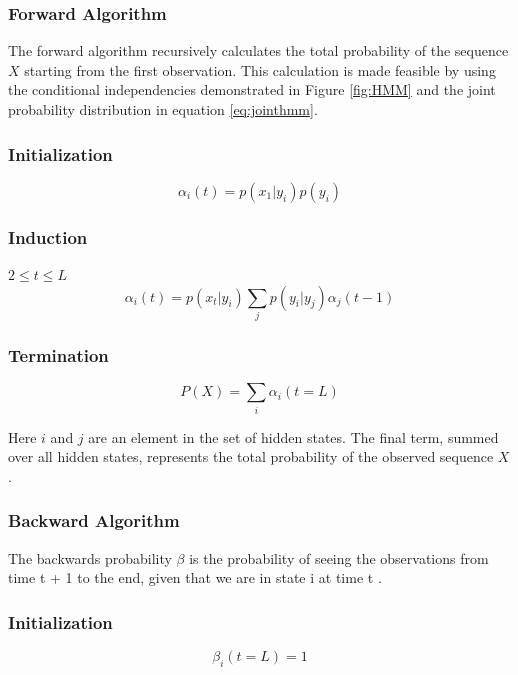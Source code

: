 \subsubsection{Forward Algorithm}
The forward algorithm recursively calculates the total probability of the sequence $X$ starting from the first observation. This calculation is made feasible by using the conditional independencies demonstrated in Figure \ref{fig:HMM} and the joint probability distribution in equation \ref{eq:jointhmm}.

\subsubsection{Initialization}
\begin{equation}
    \alpha_i(t) = p(x_1|y_i)p(y_i)
\label{eq:fwdinit}
\end{equation}

\subsubsection{Induction}
$2\leq t\leq L$
\begin{equation}
    \alpha_i(t) =p(x_t|y_i)\sum_{j}{p(y_i|y_j)\alpha_j(t-1)}
\label{eq:fwdinduc}
\end{equation}

\subsubsection{Termination}
\begin{equation}
    P(X)= \sum_i{\alpha_i(t=L)}
\label{eq:fwdterm}
\end{equation}

Here $i$ and $j$ are an element in the set of hidden states. The final term, summed over all hidden states, represents the total probability of the observed sequence $X$ \cite{Rabiner1989ARecognition}.

\subsubsection{Backward Algorithm}
The backwards probability $\beta$ is the probability of seeing the observations from time t + 1 to the end, given
that we are in state i at time t \cite{Rabiner1989ARecognition}.

\subsubsection{Initialization}
\begin{equation}
    \beta_i(t=L) = 1
\label{eq:bwdinit}
\end{equation}

